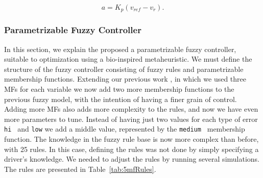\documentclass[symmetry,article,submit,moreauthors,pdftex]{Definitions/mdpi}
\begin{document}
\begin{equation}
    a = K_p(v_{ref}-v_r).
\end{equation}

\subsubsection{Parametrizable Fuzzy Controller}
In this section, we explain the proposed a parametrizable fuzzy controller,
suitable to optimization using a bio-inspired metaheuristic. We must define 
the structure of the fuzzy controller consisting of fuzzy rules and parametrizable 
membership functions.
Extending our previous work \cite{Mancilla2021}, in which we used three MFs for each 
variable we now add two more 
membership functions to the previous fuzzy model, with the intention
of having a finer grain of control. Adding more MFs also adds more
complexity to the rules, and now we have even more parameters to tune.  Instead
of having just two values for each type of error { \tt hi } and {\tt low} we
add a middle value, represented by the { \tt medium } membership function. The
knowledge in the fuzzy rule base is now more complex than before, with 25
rules. In this case, defining the rules was not done by simply specifying a
driver's knowledge. We needed to adjust the rules by running several
simulations. The rules are presented in Table~\ref{tab:5mfRules}.
\end{document}
